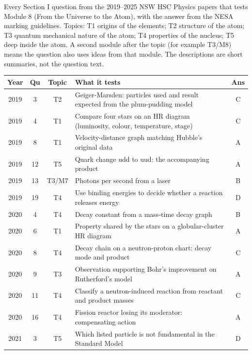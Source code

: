 \documentclass[12pt]{article}
\begin{document}
Every Section I question from the 2019--2025 NSW HSC Physics papers that tests Module 8
(From the Universe to the Atom), with the answer from the NESA marking guidelines. Topics: T1 origins of the elements; T2 structure of the atom; T3 quantum mechanical nature of the atom; T4 properties of the nucleus; T5 deep inside the atom. A second module after
the topic (for example T3/M8) means the question also uses ideas from that module. The descriptions are
short summaries, not the question text.

{\small\renewcommand{}
\begin{longtable}{|c|c|c|p{108mm}|c|}
  \hline
  \textbf{Year} & \textbf{Qu} & \textbf{Topic} & \textbf{What it tests} & \textbf{Ans}\\ \hline
  \endhead
    2019 & 3 & T2 & Geiger-Marsden: particles used and result expected from the plum-pudding model & C\\ \hline
    2019 & 4 & T1 & Compare four stars on an HR diagram (luminosity, colour, temperature, stage) & C\\ \hline
    2019 & 8 & T1 & Velocity-distance graph matching Hubble's original data & A\\ \hline
    2019 & 12 & T5 & Quark change udd to uud: the accompanying product & A\\ \hline
    2019 & 13 & T3/\allowbreak M7 & Photons per second from a laser & B\\ \hline
    2019 & 19 & T4 & Use binding energies to decide whether a reaction releases energy & D\\ \hline
    2020 & 4 & T4 & Decay constant from a mass-time decay graph & B\\ \hline
    2020 & 6 & T1 & Property shared by the stars on a globular-cluster HR diagram & A\\ \hline
    2020 & 8 & T4 & Decay chain on a neutron-proton chart: decay mode and product & C\\ \hline
    2020 & 9 & T3 & Observation supporting Bohr's improvement on Rutherford's model & A\\ \hline
    2020 & 11 & T4 & Classify a neutron-induced reaction from reactant and product masses & C\\ \hline
    2020 & 16 & T4 & Fission reactor losing its moderator: compensating action & A\\ \hline
    2021 & 3 & T5 & Which listed particle is not fundamental in the Standard Model & D\\ \hline

\end{longtable}}
\end{document}

